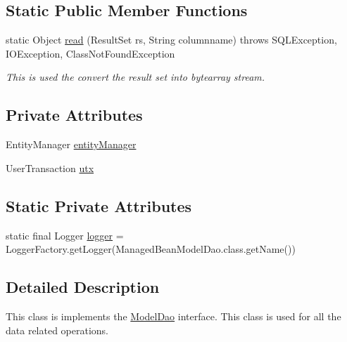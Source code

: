 \subsection*{Static Public Member Functions}
\begin{DoxyCompactItemize}
\item 
static Object \hyperlink{classorg_1_1jboss_1_1as_1_1quickstarts_1_1greeter_1_1domain_1_1_managed_bean_model_dao_a81e8eb5de194e97e02443928b9587753}{read} (Result\+Set rs, String columnname)  throws S\+Q\+L\+Exception, I\+O\+Exception, Class\+Not\+Found\+Exception 
\begin{DoxyCompactList}\small\item\em This is used the convert the result set into bytearray stream. \end{DoxyCompactList}\end{DoxyCompactItemize}
\subsection*{Private Attributes}
\begin{DoxyCompactItemize}
\item 
Entity\+Manager \hyperlink{classorg_1_1jboss_1_1as_1_1quickstarts_1_1greeter_1_1domain_1_1_managed_bean_model_dao_aa04fb7ba26de26367145006b08d29f9b}{entity\+Manager}
\item 
User\+Transaction \hyperlink{classorg_1_1jboss_1_1as_1_1quickstarts_1_1greeter_1_1domain_1_1_managed_bean_model_dao_a6974a7e0d2a2cff382cf65ee6684f8ce}{utx}
\end{DoxyCompactItemize}
\subsection*{Static Private Attributes}
\begin{DoxyCompactItemize}
\item 
static final Logger \hyperlink{classorg_1_1jboss_1_1as_1_1quickstarts_1_1greeter_1_1domain_1_1_managed_bean_model_dao_a9afb9cb8320b6ff0ebeae7a77c4166b5}{logger} = Logger\+Factory.\+get\+Logger(Managed\+Bean\+Model\+Dao.\+class.\+get\+Name())
\end{DoxyCompactItemize}


\subsection{Detailed Description}
This class is implements the \hyperlink{interfaceorg_1_1jboss_1_1as_1_1quickstarts_1_1greeter_1_1domain_1_1_model_dao}{Model\+Dao} interface. This class is used for all the data related operations. 

